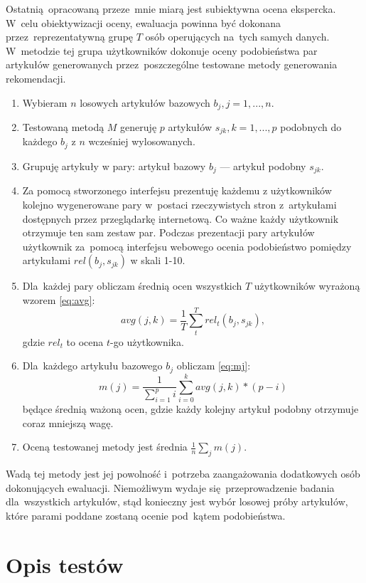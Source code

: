 \documentclass[pl]{minipw} %
\begin{document}
Ostatnią opracowaną przeze~mnie miarą jest subiektywna ocena ekspercka. W~celu obiektywizacji oceny, ewaluacja powinna być dokonana przez~reprezentatywną grupę $T$ osób operujących na~tych samych danych. W~metodzie tej grupa użytkowników dokonuje oceny podobieństwa par artykułów generowanych przez~poszczególne testowane metody generowania rekomendacji.

\begin{enumerate}
	\item Wybieram $n$ losowych artykułów bazowych $b_j, j=1,...,n$.
	\item Testowaną metodą $M$ generuję $p$ artykułów $s_{jk}, k=1,...,p$ podobnych do każdego $b_j$ z $n$ wcześniej wylosowanych.
	\item Grupuję artykuły w pary: artykuł bazowy $b_j$ --- artykuł podobny $s_{jk}$.
	\item Za pomocą stworzonego interfejsu prezentuję każdemu z użytkowników kolejno wygenerowane pary w~postaci rzeczywistych stron z~artykułami dostępnych przez przeglądarkę internetową. Co ważne każdy użytkownik otrzymuje ten sam zestaw par. Podczas prezentacji pary artykułów użytkownik za~pomocą interfejsu webowego ocenia podobieństwo pomiędzy artykułami $rel(b_j, s_{jk})$ w skali 1-10.
	\item Dla~każdej pary obliczam średnią ocen wszystkich $T$ użytkowników wyrażoną wzorem \ref{eq:avg}:
	\begin{equation}
	\label{eq:avg}
	avg(j,k)=\frac{1}{T}\sum_{t}^{T}rel_t(b_j, s_{jk}),
	\end{equation}
	gdzie $rel_t$ to ocena $t$-go użytkownika.
	\item Dla~każdego artykułu bazowego $b_j$ obliczam \ref{eq:mj}:
	\begin{equation}
	\label{eq:mj}
	m(j) = \frac{1}{\sum_{i=1}^{p}i}\sum_{i=0}^{k} avg(j,k)*(p-i)
	\end{equation}
	będące średnią ważoną ocen, gdzie każdy kolejny artykuł podobny otrzymuje coraz mniejszą wagę.
	\item Oceną testowanej metody jest średnia $\frac{1}{n}\sum_{j}m(j)$.
\end{enumerate}

Wadą tej metody jest jej powolność i~potrzeba zaangażowania dodatkowych osób dokonujących ewaluacji. Niemożliwym wydaje się~przeprowadzenie badania dla~wszystkich artykułów, stąd konieczny jest wybór losowej próby artykułów, które parami poddane zostaną ocenie pod~kątem podobieństwa.


\chapter{Opis testów}
\end{document}
